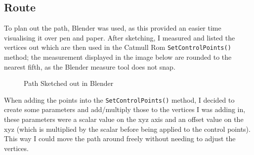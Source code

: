 \documentclass[11pt]{report}
\begin{document}
\subsection*{Route}
To plan out the path, Blender was used, as this provided an easier time visualising it over pen and paper. After sketching, I measured and listed the vertices out which are then used in the Catmull Rom \colorbox{mygrey}{\lstinline{SetControlPoints()}} method; the measurement displayed in the image below are rounded to the nearest fifth, as the Blender measure tool does not snap. 
\begin{figure}[H]
    \centering
    \caption{Path Sketched out in Blender}
\end{figure}

When adding the points into the \colorbox{mygrey}{\lstinline{SetControlPoints()}} method, I decided to create some parameters and add/multiply those to the vertices I was adding in, these parameters were a scalar value on the xyz axis and an offset value on the xyz (which is multiplied by the scalar before being applied to the control points). This way I could move the path around freely without needing to adjust the vertices.



\end{document}
